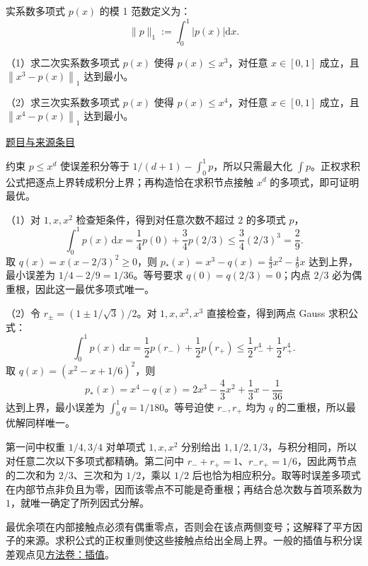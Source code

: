 \documentclass[12pt,fontset=fandol]{ctexart}
\begin{document}
\begin{example}\label{ex:fin07-hi:11}\label{pr:fin07-hi:11}

实系数多项式 $p(x)$ 的模 1 范数定义为：
\[
\|p\|_{1}:=\int_{0}^{1}\left|p(x)\right|\mathrm{d}x.
\]

（1）求二次实系数多项式 $p(x)$ 使得 $p(x)\leq x^{3}$，对任意 $x\in[0,1]$ 成立，且 $\left\|x^{3}-p(x)\right\|_{1}$ 达到最小。

（2）求三次实系数多项式 $p(x)$ 使得 $p(x)\leq x^{4}$，对任意 $x\in[0,1]$ 成立，且 $\left\|x^{4}-p(x)\right\|_{1}$ 达到最小。

\par\href{https://github.com/lzxcr/cmc-mathematics/blob/64916fa1fdbc3e444a652eca204d5669058ee321/src/problems/finals/07/13.md}{题目与来源条目}

\end{example}

\begin{solve}\label{ans:fin07-hi:11}

约束 $p\leq x^d$ 使误差积分等于 $1/(d+1)-\int_0^1p$，所以只需最大化 $\int p$。正权求积公式把逐点上界转成积分上界；再构造恰在求积节点接触 $x^d$ 的多项式，即可证明最优。

（1）对 $1,x,x^2$ 检查矩条件，得到对任意次数不超过 $2$ 的多项式 $p$，
\[
\int_0^1p(x)\,\mathrm{d}x=\frac14p(0)+\frac34p(2/3)\leq\frac34(2/3)^3=\frac29.
\]
取 $q(x)=x(x-2/3)^2\geq0$，则 $p_*(x)=x^3-q(x)=\frac43x^2-\frac49x$ 达到上界，最小误差为 $1/4-2/9=1/36$。等号要求 $q(0)=q(2/3)=0$；内点 $2/3$ 必为偶重根，因此这一最优多项式唯一。

（2）令 $r_\pm=(1\pm1/\sqrt3)/2$。对 $1,x,x^2,x^3$ 直接检查，得到两点 Gauss 求积公式：
\[
\int_0^1p(x)\,\mathrm{d}x=\frac12p(r_-)+\frac12p(r_+)\leq\frac12r_-^4+\frac12r_+^4.
\]
取 $q(x)=(x^2-x+1/6)^2$，则
\[
p_*(x)=x^4-q(x)=2x^3-\frac43x^2+\frac13x-\frac1{36}
\]
达到上界，最小误差为 $\int_0^1q=1/180$。等号迫使 $r_-,r_+$ 均为 $q$ 的二重根，所以最优解同样唯一。

第一问中权重 $1/4,3/4$ 对单项式 $1,x,x^2$ 分别给出 $1,1/2,1/3$，与积分相同，所以对任意二次以下多项式都精确。第二问中 $r_-+r_+=1$、$r_-r_+=1/6$，因此两节点的二次和为 $2/3$、三次和为 $1/2$，乘以 $1/2$ 后也恰为相应积分。取等时误差多项式在内部节点非负且为零，因而该零点不可能是奇重根；再结合总次数与首项系数为 $1$，就唯一确定了所列因式分解。

\end{solve}

\begin{remark}[方法与条件]最优余项在内部接触点必须有偶重零点，否则会在该点两侧变号；这解释了平方因子的来源。求积公式的正权重则使这些接触点给出全局上界。一般的插值与积分误差观点见\hyperref[app:estimate-interpolation]{方法卷：插值}。\end{remark}
\end{document}
